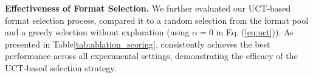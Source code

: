\noindent \textbf{Effectiveness of Format Selection.}
We further evaluated our UCT-based format selection process, compared it to a random selection from the format pool and a greedy selection without exploration (using $\alpha=0$ in Eq. (\ref{eq:uct})). 
As presented in Table\ref{tab:ablation_scoring}, \sysname{} consistently achieves the best performance across all experimental settings, demonstrating the efficacy of the UCT-based selection strategy.

\begin{table}[h]
  \centering
  \vspace{-1ex}
  \caption{Impact of different format selection strategies during optimization.}
  \label{tab:ablation_format_gen}
  \vspace{-2ex}
\end{table}



